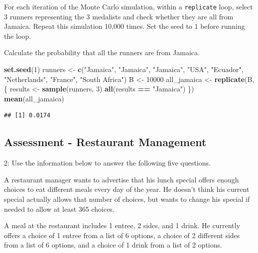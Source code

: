 \documentclass[
]{article}
\newenvironment{Shaded}{\begin{snugshade}}{\end{snugshade}}
\newcommand{\DecValTok}[1]{\textcolor[rgb]{0.00,0.00,0.81}{#1}}
\newcommand{\KeywordTok}[1]{\textcolor[rgb]{0.13,0.29,0.53}{\textbf{#1}}}
\newcommand{\NormalTok}[1]{#1}
\newcommand{\OperatorTok}[1]{\textcolor[rgb]{0.81,0.36,0.00}{\textbf{#1}}}
\newcommand{\StringTok}[1]{\textcolor[rgb]{0.31,0.60,0.02}{#1}}
\begin{document}
For each iteration of the Monte Carlo simulation, within a
\texttt{replicate} loop, select 3 runners representing the 3 medalists
and check whether they are all from Jamaica. Repeat this simulation
10,000 times. Set the seed to 1 before running the loop.

Calculate the probability that all the runners are from Jamaica.

\begin{Shaded}
\begin{Highlighting}[]
\KeywordTok{set.seed}\NormalTok{(}\DecValTok{1}\NormalTok{)}
\NormalTok{runners \textless{}{-}}\StringTok{ }\KeywordTok{c}\NormalTok{(}\StringTok{"Jamaica"}\NormalTok{, }\StringTok{"Jamaica"}\NormalTok{, }\StringTok{"Jamaica"}\NormalTok{, }\StringTok{"USA"}\NormalTok{, }\StringTok{"Ecuador"}\NormalTok{, }\StringTok{"Netherlands"}\NormalTok{, }\StringTok{"France"}\NormalTok{, }\StringTok{"South Africa"}\NormalTok{)}
\NormalTok{B \textless{}{-}}\StringTok{ }\DecValTok{10000}
\NormalTok{all\_jamaica \textless{}{-}}\StringTok{ }\KeywordTok{replicate}\NormalTok{(B, \{}
\NormalTok{  results \textless{}{-}}\StringTok{ }\KeywordTok{sample}\NormalTok{(runners, }\DecValTok{3}\NormalTok{)}
  \KeywordTok{all}\NormalTok{(results }\OperatorTok{==}\StringTok{ "Jamaica"}\NormalTok{)}
\NormalTok{\})}
\KeywordTok{mean}\NormalTok{(all\_jamaica)}
\end{Highlighting}
\end{Shaded}

\begin{verbatim}
## [1] 0.0174
\end{verbatim}

\hypertarget{assessment---restaurant-management}{%
\subsection{Assessment - Restaurant
Management}\label{assessment---restaurant-management}}

2: Use the information below to answer the following five questions.

A restaurant manager wants to advertise that his lunch special offers
enough choices to eat different meals every day of the year. He doesn't
think his current special actually allows that number of choices, but
wants to change his special if needed to allow at least 365 choices.

A meal at the restaurant includes 1 entree, 2 sides, and 1 drink. He
currently offers a choice of 1 entree from a list of 6 options, a choice
of 2 different sides from a list of 6 options, and a choice of 1 drink
from a list of 2 options.
\end{document}
